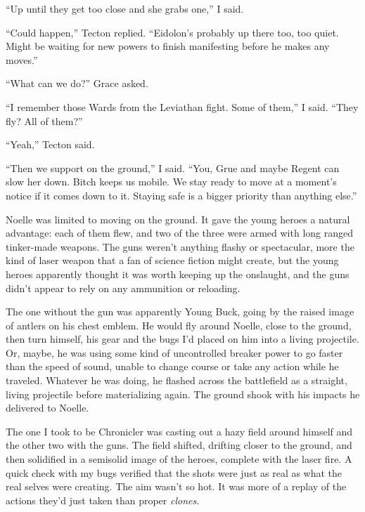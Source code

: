 ``Up until they get too close and she grabs one,'' I said.



``Could happen,'' Tecton replied.  ``Eidolon's probably up there too, too quiet.  Might be waiting for new powers to finish manifesting before he makes any moves.''



``What can we do?'' Grace asked.



``I remember those Wards from the Leviathan fight.  Some of them,'' I said.  ``They fly?  All of them?''



``Yeah,'' Tecton said.



``Then we support on the ground,'' I said.  ``You, Grue and maybe Regent can slow her down.  Bitch keeps us mobile.  We stay ready to move at a moment's notice if it comes down to it.  Staying safe is a bigger priority than anything else.''



Noelle was limited to moving on the ground.  It gave the young heroes a natural advantage: each of them flew, and two of the three were armed with long ranged tinker-made weapons.  The guns weren't anything flashy or spectacular, more the kind of laser weapon that a fan of science fiction might create, but the young heroes apparently thought it was worth keeping up the onslaught, and the guns didn't appear to rely on any ammunition or reloading.



The one without the gun was apparently Young Buck, going by the raised image of antlers on his chest emblem.  He would fly around Noelle, close to the ground, then turn himself, his gear and the bugs I'd placed on him into a living projectile.  Or, maybe, he was using some kind of uncontrolled breaker power to go faster than the speed of sound, unable to change course or take any action while he traveled.  Whatever he was doing, he flashed across the battlefield as a straight, living projectile before materializing again.  The ground shook with his impacts he delivered to Noelle.



The one I took to be Chronicler was casting out a hazy field around himself and the other two with the guns.  The field shifted, drifting closer to the ground, and then solidified in a semisolid image of the heroes, complete with the laser fire.  A quick check with my bugs verified that the shots were just as real as what the real selves were creating.  The aim wasn't so hot.  It was more of a replay of the actions they'd just taken than proper \emph{clones}.



